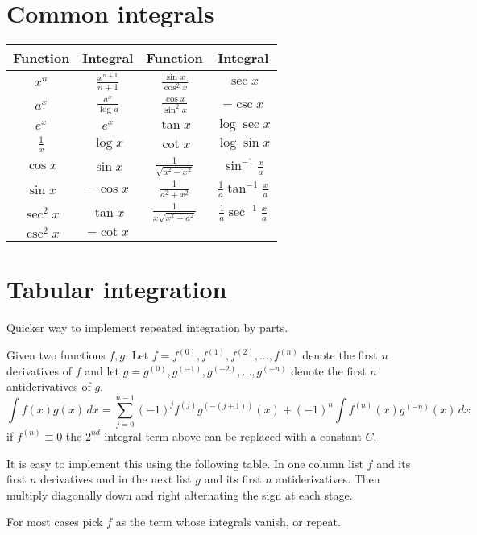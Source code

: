 \documentclass[oneside,11pt,pdftex,final]{book}%
\numberwithin{equation}{section}
\numberwithin{section}{chapter}
\numberwithin{equation}{chapter}
\begin{document}
\begin{appendices}
\section{Common integrals}
\begin{table}[h!]
	\centering
	\begin{tabular}{cccc}
		\hline
		Function & Integral & Function & Integral \\ \hline
		$x^n$ & $\frac{x^{n+1}}{n+1}$ & $\frac{\sin x}{\cos^2 x}$ & $\sec x $ \\
		$a^x$ & $\frac{a^x}{\log a}$ & $\frac{\cos x}{\sin^2 x}$ & $-\csc x $ \\
		$e^x$ & $e^x$ & $\tan x$ & $\log \sec x$ \\
		$\frac{1}{x}$ & $\log x$ & $\cot x$ & $\log \sin x$ \\
		$\cos x$ & $\sin x$ & $\frac{1}{\sqrt{a^2-x^2}}$ & $\sin^{-1}\frac{x}{a}$ \\
		$\sin x$ & $-\cos x$ & $\frac{1}{a^2+x^2}$ & $\frac{1}{a}\tan^{-1}\frac{x}{a}$ \\
		$\sec^2 x$ & $\tan x$ & $\frac{1}{x\sqrt{x^2-a^2}}$ & $\frac{1}{a}\sec^{-1}\frac{x}{a}$ \\
		$\csc^2 x$ & $-\cot x$ &  &  \\ \hline
	\end{tabular}
\end{table}

\section{Tabular integration}
Quicker way to implement repeated integration by parts. 

Given two functions $ f,g $. Let $ f=f^{(0)},f^{(1)},f^{(2)},\dots,f^{(n)} $ denote the first $ n $ derivatives of $ f $ and let $ g=g^{(0)},g^{(-1)},g^{(-2)},\dots,g^{(-n)} $ denote the first $ n $ antiderivatives of $ g $.
\[ \int f(x)g(x)\, dx= \sum_{j=0}^{n-1}(-1)^jf^{(j)}g^{(-(j+1))}(x)+(-1)^n \int f^{(n)}(x)g^{(-n)}(x)\, dx \]
if $ f^{(n)} \equiv 0 $ the $ 2^{nd} $ integral term above can be replaced with a constant $ C $.

It is easy to implement this using the following table. In one column list $ f $ and its first $ n $ derivatives and in the next list $ g $ and its first $ n $ antiderivatives. Then multiply diagonally down and right alternating the sign at each stage. 

For most cases pick $ f $ as the term whose integrals vanish, or repeat.


\end{appendices}
\end{document}
